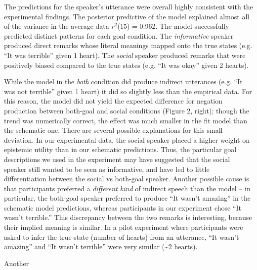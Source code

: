 The predictions for the speaker's utterance were overall highly
consistent with the experimental findings. The posterior
predictive of the model explained almost all of the variance in the
average data \(r^2\)(15) = 0.962. The model successfully
predicted distinct patterns for each goal condition. The
\emph{informative} speaker produced direct remarks whose literal
meanings mapped onto the true states (e.g. ``It was terrible'' given 1
heart). The \emph{social} speaker produced remarks that were positively
biased compared to the true states (e.g. ``It was okay'' given 2
hearts).

While the model in the \emph{both} condition did produce indirect
utterances (e.g. ``It was not terrible'' given 1 heart) it did so
slightly less than the empirical data. For this reason, the model did
not yield the expected difference for negation production between
both-goal and social conditions (Figure 2, right); though the trend was
numerically correct, the effect was much smaller in the fit model than
the schematic one. There are several possible explanations for this
small deviation. In our experimental data, the social speaker placed a
higher weight on epistemic utility than in our schematic predictions.
Thus, the particular goal descriptions we used in the experiment may
have suggested that the social speaker still wanted to be seen as
informative, and have led to little differentiation between the social
vs both-goal speaker. Another possible cause is that participants
preferred a \emph{different kind} of indirect speech than the model --
in particular, the both-goal speaker preferred to produce ``It wasn't
amazing'' in the schematic model predictions, whereas participants in
our experiment chose ``It wasn't terrible.'' This discrepancy between
the two remarks is interesting, because their implied meaning is
similar. In a pilot experiment where participants were asked to infer
the true state (number of hearts) from an utterance, ``It wasn't
amazing'' and ``It wasn't terrible'' were very similar
(\textasciitilde{}2 hearts).

Another 


